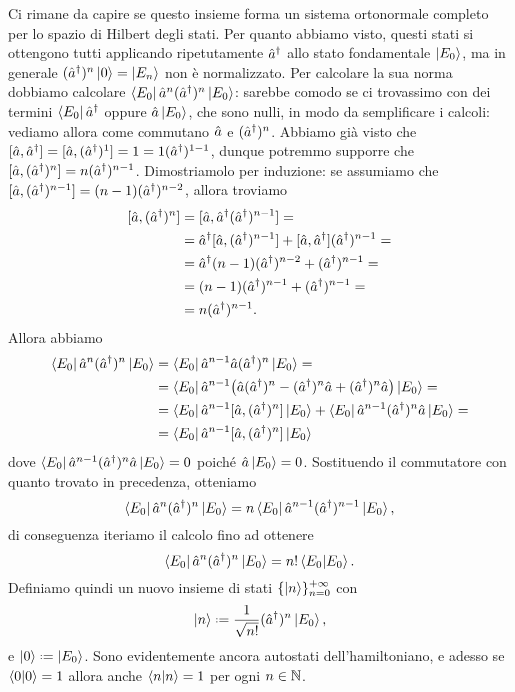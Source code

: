 Ci rimane da capire se questo insieme forma un sistema ortonormale completo per lo spazio di Hilbert degli stati.
Per quanto abbiamo visto, questi stati si ottengono tutti applicando ripetutamente ${\hat{a}}^\dagger$ allo stato fondamentale $\left|{E_0}\right\rangle$, ma in generale $({\hat{a}}^\dagger)^n\left|{0}\right\rangle=\left|{E_n}\right\rangle$ non è normalizzato.
Per calcolare la sua norma dobbiamo calcolare $\left\langle{E_0}\right|\hat{a}^n({\hat{a}}^\dagger)^n\left|{E_0}\right\rangle$: sarebbe comodo se ci trovassimo con dei termini $\left\langle{E_0}\right|{\hat{a}}^\dagger$ oppure $\hat{a}\left|{E_0}\right\rangle$, che sono nulli, in modo da semplificare i calcoli: vediamo allora come commutano $\hat{a}$ e $({\hat{a}}^\dagger)^n$.
Abbiamo già visto che $[\hat{a},{\hat{a}}^\dagger]=[\hat{a},({\hat{a}}^\dagger)^1]=1=1({\hat{a}}^\dagger)^{1-1}$, dunque potremmo supporre che $[\hat{a},({\hat{a}}^\dagger)^n]=n({\hat{a}}^\dagger)^{n-1}$.
Dimostriamolo per induzione: se assumiamo che $[\hat{a},({\hat{a}}^\dagger)^{n-1}]=(n-1)({\hat{a}}^\dagger)^{n-2}$, allora troviamo
\begin{equation}
	\begin{split}
		[\hat{a},({\hat{a}}^\dagger)^n]&=[\hat{a},{\hat{a}}^\dagger({\hat{a}}^\dagger)^{n-1}]=\\
		&={\hat{a}}^\dagger[\hat{a},({\hat{a}}^\dagger)^{n-1}]+[\hat{a},{\hat{a}}^\dagger]({\hat{a}}^\dagger)^{n-1}=\\
		&={\hat{a}}^\dagger(n-1)({\hat{a}}^\dagger)^{n-2}+({\hat{a}}^\dagger)^{n-1}=\\
		&=(n-1)({\hat{a}}^\dagger)^{n-1}+({\hat{a}}^\dagger)^{n-1}=\\
		&=n({\hat{a}}^\dagger)^{n-1}.
	\end{split}
\end{equation}
Allora abbiamo
\begin{equation}
	\begin{split}
		\left\langle{E_0}\right|\hat{a}^n({\hat{a}}^\dagger)^n\left|{E_0}\right\rangle&=\left\langle{E_0}\right|\hat{a}^{n-1}\hat{a}({\hat{a}}^\dagger)^n\left|{E_0}\right\rangle=\\
		&=\left\langle{E_0}\right|\hat{a}^{n-1}\big(\hat{a}({\hat{a}}^\dagger)^n-({\hat{a}}^\dagger)^n\hat{a}+({\hat{a}}^\dagger)^n\hat{a}\big)\left|{E_0}\right\rangle=\\
		&=\left\langle{E_0}\right|\hat{a}^{n-1}[\hat{a},({\hat{a}}^\dagger)^n]\left|{E_0}\right\rangle+\left\langle{E_0}\right|\hat{a}^{n-1}({\hat{a}}^\dagger)^n\hat{a}\left|{E_0}\right\rangle=\\
		&=\left\langle{E_0}\right|\hat{a}^{n-1}[\hat{a},({\hat{a}}^\dagger)^n]\left|{E_0}\right\rangle
	\end{split}
\end{equation}
dove $\left\langle{E_0}\right|\hat{a}^{n-1}({\hat{a}}^\dagger)^n\hat{a}\left|{E_0}\right\rangle=0$ poich\'e $\hat{a}\left|{E_0}\right\rangle=0$.
Sostituendo il commutatore con quanto trovato in precedenza, otteniamo
\begin{equation}
	\left\langle{E_0}\right|\hat{a}^n({\hat{a}}^\dagger)^n\left|{E_0}\right\rangle=n\left\langle{E_0}\right|\hat{a}^{n-1}({\hat{a}}^\dagger)^{n-1}\left|{E_0}\right\rangle,
\end{equation}
di conseguenza iteriamo il calcolo fino ad ottenere
\begin{equation}
	\left\langle{E_0}\right|\hat{a}^n({\hat{a}}^\dagger)^n\left|{E_0}\right\rangle=n!\left\langle{E_0}\middle|{E_0}\right\rangle.
\end{equation}
Definiamo quindi un nuovo insieme di stati $\{\left|{n}\right\rangle\}_{n=0}^{+\infty}$ con
\begin{equation}
	\ket{n}\defeq\frac1{\sqrt{n!}}(\adj{\op a})^n\ket{E_0},
	\label{eq:sonc-oscillatore-armonico}
\end{equation}
e $\ket{0}\defeq\ket{E_0}$.
Sono evidentemente ancora autostati dell'hamiltoniano, e adesso se $\left\langle{0}\middle|{0}\right\rangle=1$ allora anche $\left\langle{n}\middle|{n}\right\rangle=1$ per ogni $n\in\mathbb{N}$.

